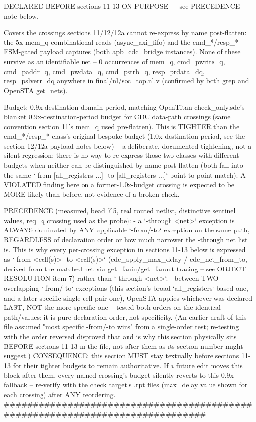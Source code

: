 \begin{record}
\begin{textblock}
DECLARED BEFORE sections 11-13 ON PURPOSE — see PRECEDENCE note below.

Covers the crossings sections 11/12/12a cannot re-express by name
post-flatten: the 5x mem_q combinational reads (async_axi_fifo) and the
cmd_*/resp_* FSM-gated payload captures (both apb_cdc_bridge instances).
None of these survive as an identifiable net -- 0 occurrences of mem_q,
cmd_pwrite_q, cmd_paddr_q, cmd_pwdata_q, cmd_pstrb_q, resp_prdata_dq,
resp_pslverr_dq anywhere in final/nl/soc_top.nl.v (confirmed by both grep
and OpenSTA get_nets).

Budget: 0.9x destination-domain period, matching OpenTitan
check_only.sdc's blanket 0.9x-destination-period budget for CDC data-path
crossings (same convention section 11's mem_q used pre-flatten). This is
TIGHTER than the cmd_*/resp_* class's original bespoke budget (1.0x
destination period, see the section 12/12a payload notes below) -- a
deliberate, documented tightening, not a silent regression: there is no
way to re-express those two classes with different budgets when neither
can be distinguished by name post-flatten (both fall into the same
`-from [all_registers ...] -to [all_registers ...]` point-to-point
match). A VIOLATED finding here on a former-1.0x-budget crossing is
expected to be MORE likely than before, not evidence of a broken check.

PRECEDENCE (measured, bead 7l5, real routed netlist, distinctive sentinel
values, req_q crossing used as the probe):
  - a `-through <net>` exception is ALWAYS dominated by ANY applicable
    `-from/-to` exception on the same path, REGARDLESS of declaration
    order or how much narrower the -through net list is. This is why
    every per-crossing exception in sections 11-13 below is expressed as
    `-from <cell(s)> -to <cell(s)>` (cdc_apply_max_delay / cdc_net_from_to,
    derived from the matched net via get_fanin/get_fanout tracing -- see
    OBJECT RESOLUTION item 7) rather than `-through <net>`.
  - between TWO overlapping `-from/-to` exceptions (this section's broad
    `all_registers`-based one, and a later specific single-cell-pair
    one), OpenSTA applies whichever was declared LAST, NOT the more
    specific one -- tested both orders on the identical path/values; it
    is pure declaration order, not specificity. (An earlier draft of this
    file assumed "most specific -from/-to wins" from a single-order test;
    re-testing with the order reversed disproved that and is why this
    section physically sits BEFORE sections 11-13 in the file, not after
    them as its section number might suggest.)
CONSEQUENCE: this section MUST stay textually before sections 11-13 for
their tighter budgets to remain authoritative. If a future edit moves
this block after them, every named crossing's budget silently reverts to
this 0.9x fallback -- re-verify with the check target's .rpt files
(max_delay value shown for each crossing) after ANY reordering.
##############################################################################
\end{textblock}


\end{record}
